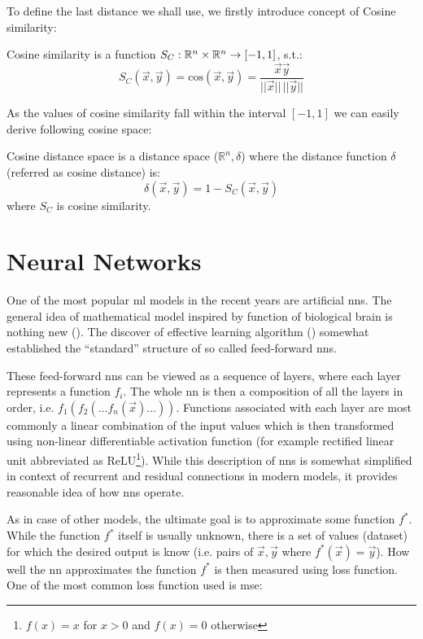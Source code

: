 To define the last distance we shall use, we firstly introduce concept
of Cosine similarity:

\begin{defn}
Cosine similarity is a function $S_C : \mathbb{R}^n \times \mathbb{R}^n \rightarrow [-1, 1]$, s.t.:
$$S_C(\vec{x}, \vec{y}) = \mathrm{cos}(\vec{x}, \vec{y}) = \frac{\vec{x}\vec{y}}{||\vec{x}||\,||\vec{y}||}$$
\end{defn}
As the values of cosine similarity fall within the interval $[-1,1]$ we can
easily derive following cosine space:
\begin{defn}
Cosine distance space is a distance space ($\mathbb{R}^n, \delta$) where the distance
function $\delta$ (referred as cosine distance) is:
$$\delta(\vec{x}, \vec{y}) = 1 - S_C(\vec{x}, \vec{y})$$
where $S_C$ is cosine similarity.
\end{defn}

\section{Neural Networks}
\label{sec:nn}

One of the most popular \gls{ml} models in the recent years are
artificial \glspl{nn}. The general idea of mathematical model inspired by
function of biological brain is nothing new (\cite{first_nn}). The discover
of effective learning algorithm (\cite{backprop}) somewhat established the
``standard'' structure of so called feed-forward \glspl{nn}.

These feed-forward \glspl{nn} can be viewed as a sequence of layers, where each
layer represents a function $f_i$. The whole \gls{nn} is then a composition of all
the layers in order, i.e. $f_1(f_2(\ldots f_n(\vec{x})\ldots))$. Functions
associated with each layer are most commonly a linear combination of the input
values which is then transformed using non-linear differentiable  activation
function (for example rectified linear unit abbreviated as ReLU\footnote{$f(x)
= x$ for $x > 0$ and $f(x) = 0$ otherwise}). While this description of 
\glspl{nn} is somewhat simplified in context of recurrent and residual 
connections in modern models, it provides reasonable idea of how \glspl{nn}
operate.

As in case of other  models, the ultimate goal is to
approximate some function $f^*$. While the function $f^*$ itself is usually
unknown, there is a set of values (dataset) for which the desired output is know
(i.e. pairs of $\vec{x}, \vec{y}$ where $f^*(\vec{x}) = \vec{y}$). How well
the \gls{nn} approximates the function $f^*$ is then measured using loss
function. One of the most common loss function used is \gls{mse}:

